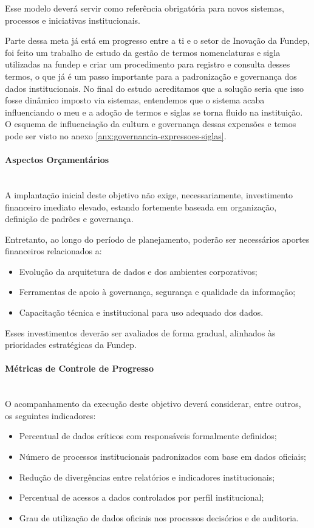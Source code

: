 \documentclass[12pt,a4paper]{article}
\begin{document}
Esse modelo deverá servir como referência obrigatória para novos sistemas, processos e iniciativas institucionais.

Parte dessa meta já está em progresso entre a \gls{ti} e o setor de Inovação da Fundep, foi feito um trabalho de estudo da gestão de termos nomenclaturas e sigla utilizadas na \gls{fundep} e criar um procedimento para registro e consulta desses termos, o que já é um passo importante para a padronização e governança dos dados institucionais. No final do estudo acreditamos que a solução seria que isso fosse dinâmico imposto via sistemas, entendemos que o sistema acaba influenciando o meu e a adoção de termos e siglas se torna fluido na instituição. O esquema de influenciação da cultura e governança dessas expensões e temos pode ser visto no anexo \ref{anx:governancia-expressoes-siglas}.

\paragraph{Aspectos Orçamentários}\mbox{}\\
A implantação inicial deste objetivo não exige, necessariamente, investimento financeiro imediato elevado, estando fortemente baseada em organização, definição de padrões e governança.

Entretanto, ao longo do período de planejamento, poderão ser necessários aportes financeiros relacionados a:
\begin{itemize}
  \item Evolução da arquitetura de dados e dos ambientes corporativos;
  \item Ferramentas de apoio à governança, segurança e qualidade da informação;
  \item Capacitação técnica e institucional para uso adequado dos dados.
\end{itemize}

Esses investimentos deverão ser avaliados de forma gradual, alinhados às prioridades estratégicas da Fundep.

\paragraph{Métricas de Controle de Progresso}\mbox{}\\
O acompanhamento da execução deste objetivo deverá considerar, entre outros, os seguintes indicadores:

\begin{itemize}
  \item Percentual de dados críticos com responsáveis formalmente definidos;
  \item Número de processos institucionais padronizados com base em dados oficiais;
  \item Redução de divergências entre relatórios e indicadores institucionais;
  \item Percentual de acessos a dados controlados por perfil institucional;
  \item Grau de utilização de dados oficiais nos processos decisórios e de auditoria.
\end{itemize}
\end{document}
